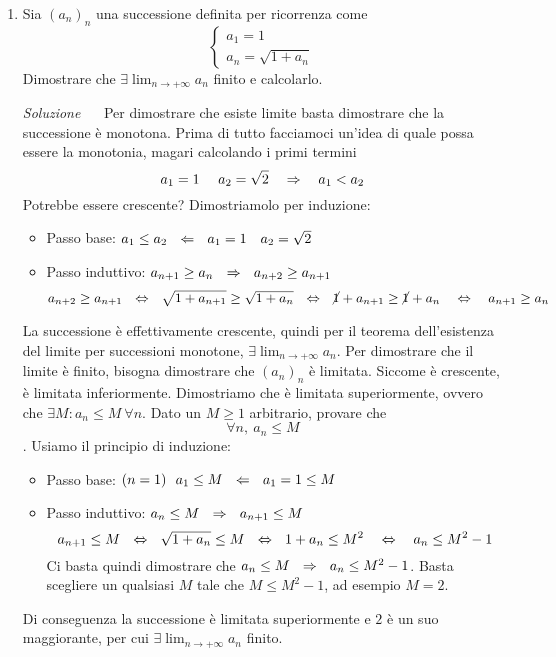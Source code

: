 \documentclass{article}
\begin{document}
\begin{enumerate}[label=\textbf{Esercizio 6.\arabic*.},itemindent=*]
\begin{enumerate}
    \end{enumerate}
    \item Sia $(a_n)_n$ una successione definita per ricorrenza come 
    \[\begin{cases}
        a_1=1\\
        a_n=\sqrt{1+a_n}
    \end{cases}\]
    Dimostrare che $\exists \lim_{n\to+ \infty}a_n$ finito e calcolarlo.
    \item[\textit{\large Soluzione~}]~
    Per dimostrare che esiste limite basta dimostrare che la successione è monotona.
    Prima di tutto facciamoci un'idea di quale possa essere la monotonia, magari calcolando i primi termini
    \[a_1=1~~~~a_2=\sqrt{2}~~~\Rightarrow~~~a_1<a_2\]
    Potrebbe essere crescente? Dimostriamolo per induzione:
    \begin{itemize} 
        \item Passo base: $a_1\leq a_2~~\Leftarrow~~a_1=1~~~a_2=\sqrt{2}$
        \item Passo induttivo:  $a_{n+1}\geq a_n ~~\Rightarrow~~ a_{n+2}\geq a_{n+1}$
        \[a_{n+2}\geq a_{n+1}~~\Leftrightarrow ~~ \sqrt{1+a_{n+1}}\geq \sqrt{1+a_n}~~\Leftrightarrow~~\cancel{1}+a_{n+1}\geq\cancel{1}+a_n~~~\Leftrightarrow~~~a_{n+1}\geq a_n\]
    \end{itemize}
    La successione è effettivamente crescente, quindi per il teorema dell'esistenza del limite per successioni monotone, $\exists \lim_{n\to+\infty}a_n$. Per dimostrare che il limite è finito, bisogna dimostrare che $(a_n)_n$ è limitata. Siccome è crescente, è limitata inferiormente. Dimostriamo che è limitata superiormente, ovvero che $\exists M:a_n\leq M~\forall n$. Dato un $M\geq 1$ arbitrario, provare che \[\forall n, ~a_n\leq M\]. Usiamo il principio di induzione:
    \begin{itemize} 
        \item Passo base: $(n=1) ~~a_1\leq M~~\Leftarrow~~a_1=1\leq M$
        \item Passo induttivo:  $a_n\leq M ~~\Rightarrow~~ a_{n+1}\leq M$
        \[a_{n+1}\leq M~~\Leftrightarrow ~~ \sqrt{1+a_{n}}\leq M~~\Leftrightarrow~~1+a_{n}\leq M
        ^2~~~\Leftrightarrow~~~a_{n}\leq M
        ^2-1\]
        Ci basta quindi dimostrare che $a_n\leq M ~~\Rightarrow~~ a_{n}\leq M^2-1$. Basta scegliere un qualsiasi $M$ tale che $M\leq M^2-1$, ad esempio $M=2$. 
    \end{itemize}
    Di conseguenza la successione è limitata superiormente e $2$ è un suo maggiorante, per cui $\exists \lim_{n\to+ \infty}a_n$ finito.
    \begin{oss}

\end{oss}
\end{enumerate}
\end{document}

